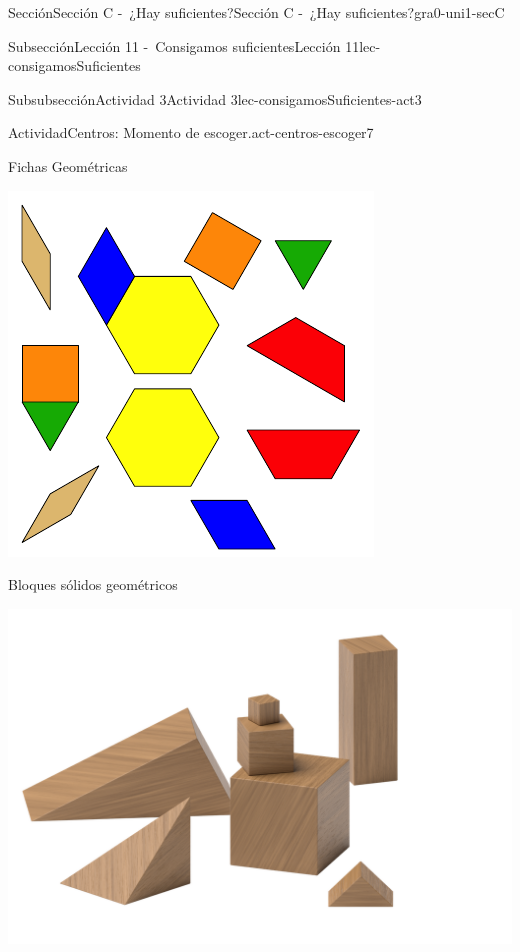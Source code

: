 \documentclass[twoside,10pt,]{article}
\begin{document}
\begin{sectionptx}{Sección}{Sección C -~¿Hay suficientes?}{}{Sección C -~¿Hay suficientes?}{}{}{gra0-uni1-secC}
\begin{subsectionptx}{Subsección}{Lección 11 -~Consigamos suficientes}{}{Lección 11}{}{}{lec-consigamosSuficientes}
\begin{subsubsectionptx}{Subsubsección}{Actividad 3}{}{Actividad 3}{}{}{lec-consigamosSuficientes-act3}
\begin{activity}{Actividad}{Centros: Momento de escoger.}{act-centros-escoger7}
\begin{sidebyside}{2}{0.025}{0.025}{0.05}
\begin{sbspanel}{0.45}
\end{sbspanel}%
\begin{sbspanel}{0.45}%
Fichas Geométricas%
\par
\includegraphics[width=\linewidth]{external/svg-source/tikz-file-147344.pdf}
\end{sbspanel}%
\end{sidebyside}%
\begin{sidebyside}{2}{0.025}{0.025}{0.05}%
\begin{sbspanel}{0.45}%
Bloques sólidos geométricos%
\par
\includegraphics[width=\linewidth]{external/png-source/K.1.A Beta Student Workbook.Geoblocks.png}

\end{sbspanel}
\end{sidebyside}
\end{activity}
\end{subsubsectionptx}
\end{subsectionptx}
\end{sectionptx}
\end{document}
